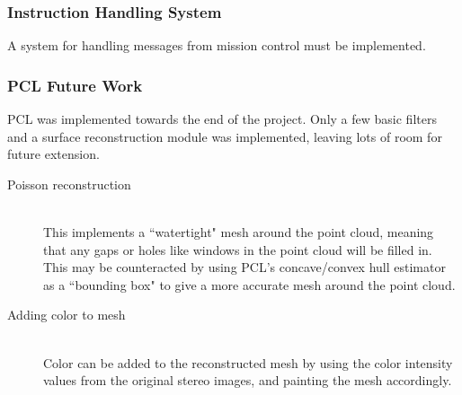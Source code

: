 \subsubsection{Instruction Handling System}
A system for handling messages from mission control must be implemented.

\subsubsection{PCL Future Work}
PCL was implemented towards the end of the project. Only a few basic filters and a surface reconstruction module was implemented, leaving lots of room for future extension.
\begin{description}
\item[Poisson reconstruction]\hfill \\
This implements a ``watertight" mesh around the point cloud, meaning that any gaps or holes like windows in the point cloud will be filled in. This may be counteracted by using PCL's concave/convex hull estimator as a ``bounding box" to give a more accurate mesh around the point cloud.
\item[Adding color to mesh]\hfill \\
Color can be added to the reconstructed mesh by using the color intensity values from the original stereo images, and painting the mesh accordingly.
\end{description}



